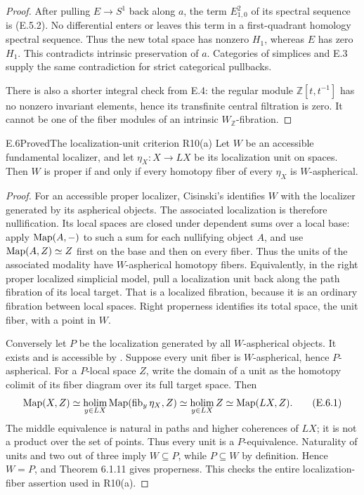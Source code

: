 \begin{proof}
After pulling $E\to S^1$ back along $a$, the term
$E^2_{1,0}$ of its spectral sequence is (E.5.2).
No differential enters or leaves this term in a
first-quadrant homology spectral sequence. Thus the
new total space has nonzero $H_1$, whereas $E$ has zero
$H_1$. This contradicts intrinsic preservation of $a$.
Categories of simplices and E.3 supply the same contradiction
for strict categorical pullbacks.

There is also a shorter integral check from E.4:
the regular module $\mathbb Z[t,t^{-1}]$ has no nonzero
invariant elements, hence its transfinite central filtration
is zero. It cannot be one of the fiber modules of an
intrinsic $W_{\mathbb Z}$-fibration.
\end{proof}

\begin{claim}{E.6}{Proved}{The localization-unit criterion R10(a)}
Let $W$ be an accessible fundamental localizer, and let
$\eta_X:X\to LX$ be its localization unit on spaces.
Then $W$ is proper if and only if every homotopy fiber
of every $\eta_X$ is $W$-aspherical.
\end{claim}
\begin{proof}
For an accessible proper localizer, Cisinski's
\citet[Theorem 6.1.11]{EH5Cisinski2006} identifies $W$
with the localizer generated by its aspherical objects.
The associated localization is therefore nullification.
Its local spaces are closed under dependent sums over
a local base: apply $\operatorname{Map}(A,-)$ to such a sum for each
nullifying object $A$, and use
$\operatorname{Map}(A,Z)\simeq Z$ first on the base and then on
every fiber. Thus the units of the associated modality
have $W$-aspherical homotopy fibers. Equivalently, in
the right proper localized simplicial model, pull a
localization unit back along the path fibration of
its local target. That is a localized fibration,
because it is an ordinary fibration between local
spaces. Right properness identifies its total space,
the unit fiber, with a point in $W$.

Conversely let $P$ be the localization generated by all
$W$-aspherical objects. It exists and is accessible
by \citet[Proposition 6.1.8]{EH5Cisinski2006}.
Suppose every unit fiber is $W$-aspherical, hence
$P$-aspherical. For a $P$-local space $Z$, write the
domain of a unit as the homotopy colimit of its
fiber diagram over its full target space. Then
\[
 \operatorname{Map}(X,Z)
   \simeq\operatorname*{holim}_{y\in LX}\operatorname{Map}(\operatorname{fib}_y\eta_X,Z)
   \simeq\operatorname*{holim}_{y\in LX}Z
   \simeq\operatorname{Map}(LX,Z).                                    \tag{E.6.1}
\]
The middle equivalence is natural in paths and
higher coherences of $LX$; it is not a product
over the set of points. Thus every unit is a
$P$-equivalence. Naturality of units and two out
of three imply $W\subseteq P$, while $P\subseteq W$
by definition. Hence $W=P$, and Theorem 6.1.11
gives properness. This checks the entire
localization-fiber assertion used in R10(a).
\end{proof}


